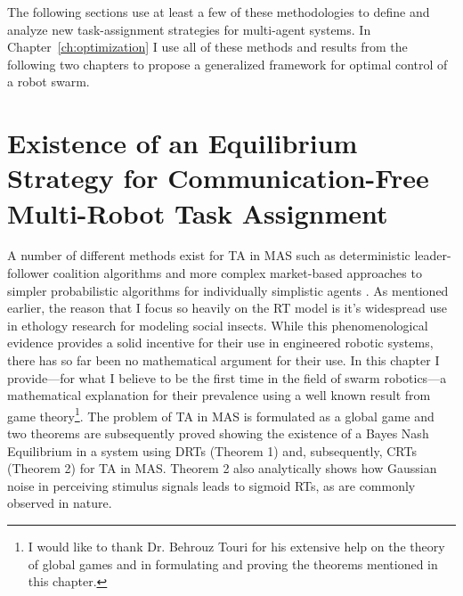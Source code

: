 \documentclass[defaultstyle,12pt]{thesis}
\begin{document}
The following sections use at least a few of these methodologies to define and analyze new task-assignment strategies for multi-agent systems. In Chapter~\ref{ch:optimization} I use all of these methods and results from the following two chapters to propose a generalized framework for optimal control of a robot swarm.

\chapter{Existence of an Equilibrium Strategy for Communication-Free Multi-Robot Task Assignment}\label{ch:existeqrtm}
A number of different methods exist for TA in MAS such as deterministic leader-follower coalition algorithms \cite{Chen2011} and more complex market-based approaches \cite{Amstutz2008} to simpler probabilistic algorithms for individually simplistic agents \cite{Dantu2012}. As mentioned earlier, the reason that I focus so heavily on the RT model is it's widespread use in ethology research for modeling social insects. While this phenomenological evidence provides a solid incentive for their use in engineered robotic systems, there has so far been no mathematical argument for their use. In this chapter I provide---for what I believe to be the first time in the field of swarm robotics---a mathematical explanation for their prevalence using a well known result from game theory\footnote{I would like to thank Dr. Behrouz Touri for his extensive help on the theory of global games and in formulating and proving the theorems mentioned in this chapter.}. The problem of TA in MAS is formulated as a global game and two theorems are subsequently proved showing the existence of a Bayes Nash Equilibrium in a system using DRTs (Theorem 1) and, subsequently, CRTs (Theorem 2) for TA in MAS. Theorem 2 also analytically shows how Gaussian noise in perceiving stimulus signals leads to sigmoid RTs, as are commonly observed in nature.
\end{document}
